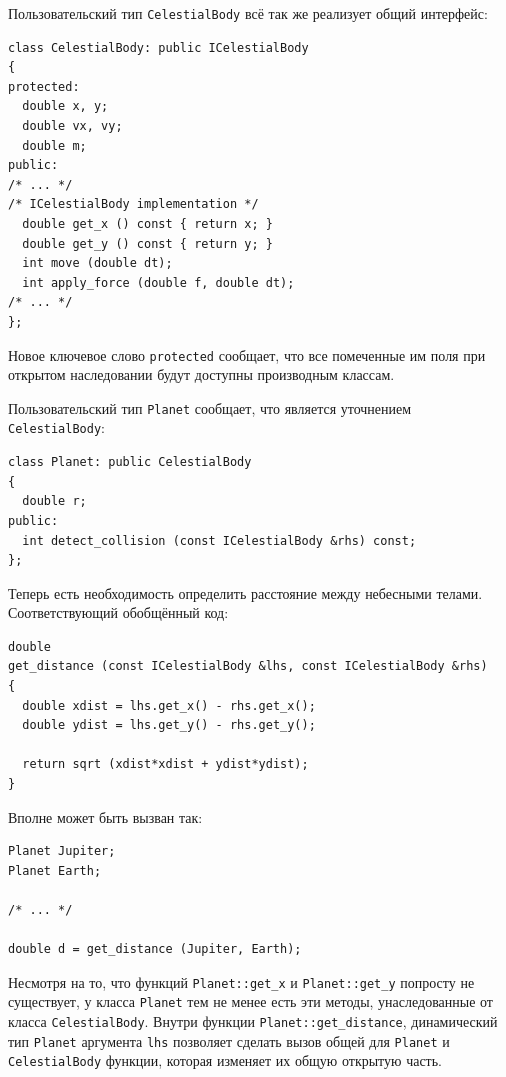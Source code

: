 \documentclass[a4paper,12pt,oneside]{article}
\begin{document}
Пользовательский тип \lstinline!CelestialBody! всё так же реализует общий интерфейс:

\begin{lstlisting}
class CelestialBody: public ICelestialBody
{
protected:
  double x, y;
  double vx, vy;
  double m;
public:
/* ... */
/* ICelestialBody implementation */
  double get_x () const { return x; }
  double get_y () const { return y; }
  int move (double dt); 
  int apply_force (double f, double dt);
/* ... */
};
\end{lstlisting}

Новое ключевое слово \lstinline!protected! сообщает, что все помеченные им поля при открытом наследовании будут доступны производным классам.

Пользовательский тип \lstinline!Planet! сообщает, что является уточнением \lstinline!CelestialBody!:

\begin{lstlisting}
class Planet: public CelestialBody
{
  double r;
public:
  int detect_collision (const ICelestialBody &rhs) const;
};
\end{lstlisting}

Теперь есть необходимость определить расстояние между небесными телами. Соответствующий обобщённый код:

\begin{lstlisting}
double 
get_distance (const ICelestialBody &lhs, const ICelestialBody &rhs)
{
  double xdist = lhs.get_x() - rhs.get_x();
  double ydist = lhs.get_y() - rhs.get_y();

  return sqrt (xdist*xdist + ydist*ydist);
}
\end{lstlisting}

Вполне может быть вызван так:

\begin{lstlisting}
Planet Jupiter;
Planet Earth;

/* ... */

double d = get_distance (Jupiter, Earth);
\end{lstlisting}

Несмотря на то, что функций \lstinline!Planet::get_x! и \lstinline!Planet::get_y! попросту не существует, у класса \lstinline!Planet! тем не менее есть эти методы, унаследованные от класса \lstinline!CelestialBody!. Внутри функции \lstinline!Planet::get_distance!, динамический тип \lstinline!Planet! аргумента \lstinline!lhs! позволяет сделать вызов общей для \lstinline!Planet! и \lstinline!CelestialBody! функции, которая изменяет их общую открытую часть.
\end{document}
